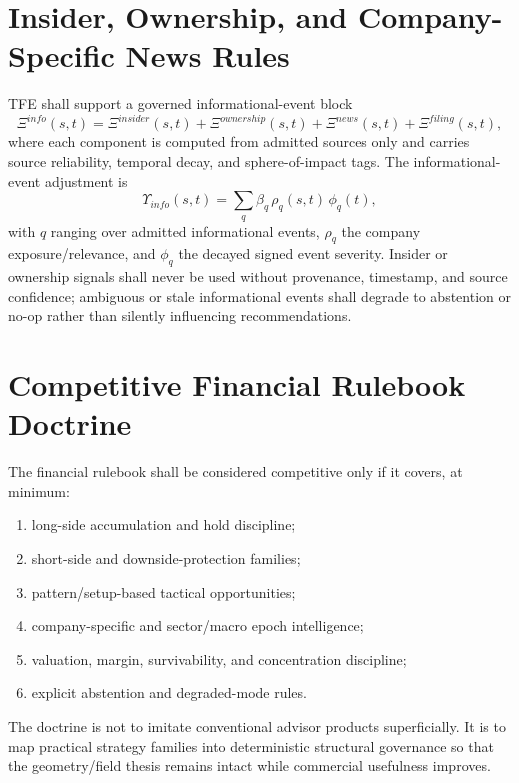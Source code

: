 \section{Insider, Ownership, and Company-Specific News Rules}

TFE shall support a governed informational-event block
\[
\Xi^{info}(s,t)=\Xi^{insider}(s,t)+\Xi^{ownership}(s,t)+\Xi^{news}(s,t)+\Xi^{filing}(s,t),
\]
where each component is computed from admitted sources only and carries source reliability, temporal decay, and sphere-of-impact tags. The informational-event adjustment is
\[
\Upsilon_{info}(s,t)=\sum_{q} \beta_q\,\rho_q(s,t)\,\phi_q(t),
\]
with $q$ ranging over admitted informational events, $\rho_q$ the company exposure/relevance, and $\phi_q$ the decayed signed event severity. Insider or ownership signals shall never be used without provenance, timestamp, and source confidence; ambiguous or stale informational events shall degrade to abstention or no-op rather than silently influencing recommendations.

\section{Competitive Financial Rulebook Doctrine}

The financial rulebook shall be considered competitive only if it covers, at minimum:
\begin{enumerate}[leftmargin=1.2cm]
    \item long-side accumulation and hold discipline;
    \item short-side and downside-protection families;
    \item pattern/setup-based tactical opportunities;
    \item company-specific and sector/macro epoch intelligence;
    \item valuation, margin, survivability, and concentration discipline;
    \item explicit abstention and degraded-mode rules.
\end{enumerate}
The doctrine is not to imitate conventional advisor products superficially. It is to map practical strategy families into deterministic structural governance so that the geometry/field thesis remains intact while commercial usefulness improves.
